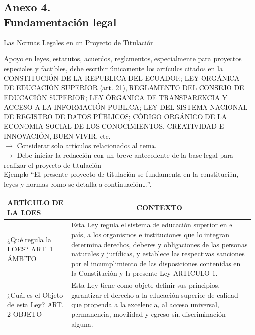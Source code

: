 \documentclass[12pt, a4paper, nofontenc, numbers=endperiod]{apa7}
\begin{document}
{\subsection*{\normalsize \centering Anexo 4. \\ Fundamentación legal}
\begin{center}
	Las Normas Legales en un Proyecto de Titulación
\end{center}
Apoyo en leyes, estatutos, acuerdos, reglamentos, especialmente para proyectos especiales y factibles, debe escribir únicamente los artículos citados en la CONSTITUCIÓN DE LA REPUBLICA DEL ECUADOR; LEY ORGÁNICA DE EDUCACIÓN SUPERIOR (art. 21), REGLAMENTO DEL CONSEJO DE EDUCACIÓN SUPERIOR; LEY ÓRGANICA DE TRANSPARENCIA Y ACCESO A LA INFORMACIÓN PUBLICA; LEY DEL SISTEMA NACIONAL DE REGISTRO DE DATOS PÚBLICOS; CÓDIGO ORGÁNICO DE LA ECONOMIA SOCIAL DE LOS CONOCIMIENTOS, CREATIVIDAD E INNOVACIÓN, BUEN VIVIR, etc.\\
$\rightarrow$ Considerar solo artículos relacionados al tema. \\
$\rightarrow$ Debe iniciar la redacción con un breve antecedente de la base legal para realizar el proyecto de titulación. \\
Ejemplo “El presente proyecto de titulación se fundamenta en la constitución, leyes y normas como se detalla a continuación…”.  
\newpage
\begin{table}[h]
	{\renewcommand{\arraystretch}{1.2}	
		{\singlespacing
			\begin{tabular}{|p{4cm}|p{11.1cm}|}
				\hline
				\multicolumn{1}{|p{4cm}|}{ARTÍCULO DE LA LOES} &  \multicolumn{1}{c|}{CONTEXTO} \\
				\hline
				\vspace*{3mm}\centering \footnotesize ¿Qué regula la LOES? ART. 1 ÁMBITO &  Esta Ley regula el sistema de educación superior en el país, a los organismos e instituciones que lo integran; determina derechos, deberes y obligaciones de las personas naturales y jurídicas, y establece las respectivas sanciones por el incumplimiento de las disposiciones contenidas en la Constitución y la presente Ley   ARTICULO 1. \\
				\hline
				\vspace*{-0.5mm}\centering\footnotesize¿Cuál es el Objeto de esta Ley? ART. 2 OBJETO &   \footnotesize Esta Ley tiene como objeto definir sus principios, garantizar el derecho a la educación superior de calidad que propenda a la excelencia, al acceso universal, permanencia, movilidad y egreso sin discriminación alguna.\\

\end{tabular}}}
\end{table}}
\end{document}
